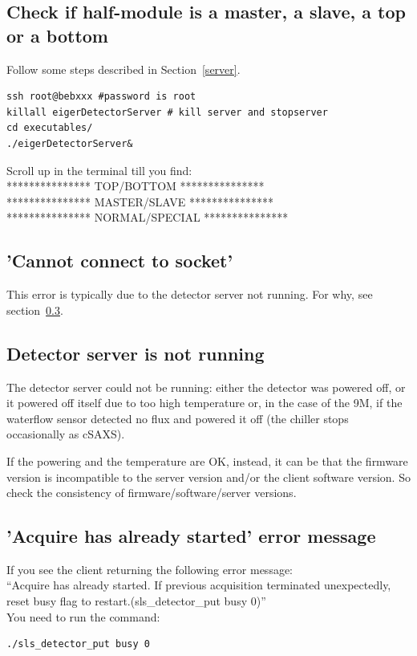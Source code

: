 \documentclass{article}
\begin{document}
\subsection{Check if half-module is a master, a slave, a top or a bottom}
Follow some steps described in Section~\ref{server}.
\begin{verbatim}
ssh root@bebxxx #password is root
killall eigerDetectorServer # kill server and stopserver
cd executables/
./eigerDetectorServer&
\end{verbatim}
Scroll up in the terminal till you find:\\
*************** TOP/BOTTOM ***************\\
*************** MASTER/SLAVE ***************\\
*************** NORMAL/SPECIAL ***************\\

\subsection{'Cannot connect to socket'}
This error is typically due to the detector server not running. For why, see section~\ref{servernot}.

\subsection{Detector server is not running}\label{servernot}
The detector server could not be running: either the detector was powered off, or it powered off itself due to too high temperature or, in the case of the 9M, if the waterflow sensor detected no flux and powered it off (the chiller stops occasionally as cSAXS).

If the powering and the temperature are OK, instead, it can be that the firmware version is incompatible to the server version and/or the client software version. So check the consistency of firmware/software/server versions.

\subsection{'Acquire has already started' error message}
If you see the client returning the following error message:\\ 
``Acquire has already started. If previous acquisition terminated unexpectedly, reset busy flag to restart.(sls\_detector\_put busy 0)''\\
 You need to run the command:
\begin{verbatim}
./sls_detector_put busy 0
\end{verbatim}
\end{document}
